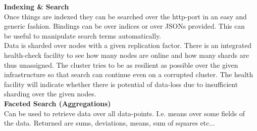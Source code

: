 \documentclass[12pt]{scrartcl}
\begin{document}
\textbf{Indexing \& Search}\\
Once things are indexed they can be searched over the http-port in an easy and generic fashion. Bindings can be over indices or over JSONs provided. This can be useful to manipulate search terms automatically.\\
Data is sharded over nodes with a given replication factor. There is an integrated health-check facility to see how many nodes are online and how many shards are thus unassigned. The cluster tries to be as resilient as possible over the given infrastructure so that search can continue even on a corrupted cluster. The health facility will indicate whether there is potential of data-loss due to insufficient sharding over the given nodes.\\

\textbf{Faceted Search (Aggregations)}\\
Can be used to retrieve data over all data-points. I.e. means over some fields of the data. Returned are sums, deviations, means, sum of squares etc...
\end{document}
